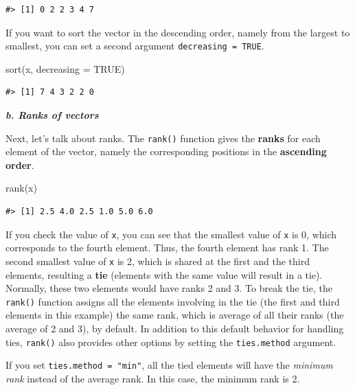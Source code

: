 \documentclass[
]{book}
\newenvironment{Shaded}{\begin{snugshade}}{\end{snugshade}}
\newcommand{\AttributeTok}[1]{\textcolor[rgb]{0.77,0.63,0.00}{#1}}
\newcommand{\ConstantTok}[1]{\textcolor[rgb]{0.00,0.00,0.00}{#1}}
\newcommand{\FunctionTok}[1]{\textcolor[rgb]{0.00,0.00,0.00}{#1}}
\newcommand{\NormalTok}[1]{#1}
\begin{document}
\begin{verbatim}
#> [1] 0 2 2 3 4 7
\end{verbatim}

If you want to sort the vector in the descending order, namely from the largest to smallest, you can set a second argument \texttt{decreasing\ =\ TRUE}.

\begin{Shaded}
\begin{Highlighting}[]
\FunctionTok{sort}\NormalTok{(x, }\AttributeTok{decreasing =} \ConstantTok{TRUE}\NormalTok{)}
\end{Highlighting}
\end{Shaded}

\begin{verbatim}
#> [1] 7 4 3 2 2 0
\end{verbatim}

\textbf{\emph{b. Ranks of vectors}}

Next, let's talk about ranks. The \texttt{rank()} function gives the \textbf{ranks} for each element of the vector, namely the corresponding positions in the \textbf{ascending order}.

\begin{Shaded}
\begin{Highlighting}[]
\FunctionTok{rank}\NormalTok{(x)}
\end{Highlighting}
\end{Shaded}

\begin{verbatim}
#> [1] 2.5 4.0 2.5 1.0 5.0 6.0
\end{verbatim}

If you check the value of \texttt{x}, you can see that the smallest value of \texttt{x} is 0, which corresponds to the fourth element. Thus, the fourth element has rank 1. The second smallest value of \texttt{x} is 2, which is shared at the first and the third elements, resulting a \textbf{tie} (elements with the same value will result in a tie). Normally, these two elements would have ranks 2 and 3. To break the tie, the \texttt{rank()} function assigns all the elements involving in the tie (the first and third elements in this example) the same rank, which is average of all their ranks (the average of 2 and 3), by default. In addition to this default behavior for handling ties, \texttt{rank()} also provides other options by setting the \texttt{ties.method} argument.

If you set \texttt{ties.method\ =\ "min"}, all the tied elements will have the \emph{minimum rank} instead of the average rank. In this case, the minimum rank is 2.
\end{document}
